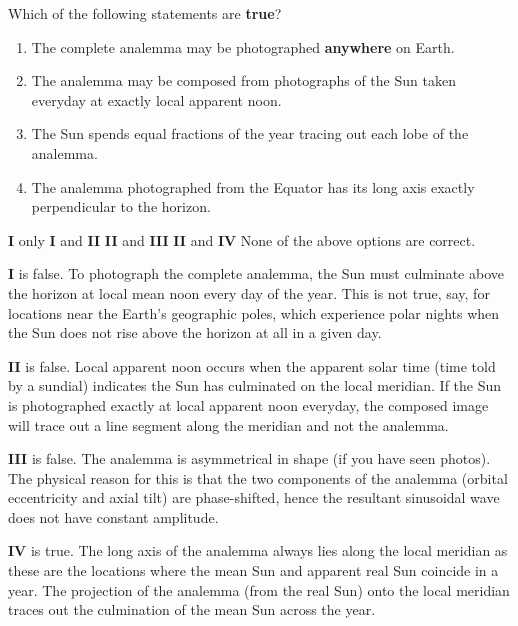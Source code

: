 \documentclass[a4paper,11pt]{exam}
\begin{document}
\begin{questions}
\filbreak
\question
	Which of the following statements are \textbf{true}?
	\begin{enumerate}[align=left,labelsep=0pt,leftmargin=0pt,labelsep=3pt,itemindent=23pt,parsep=6pt,label=\textbf{\Roman{*}}.]
		\item   The complete analemma may be photographed \textbf{anywhere} on Earth.
		\item	The analemma may be composed from photographs of the Sun taken everyday at exactly local \hspace*{20pt} apparent noon.
		\item	The Sun spends equal fractions of the year tracing out each lobe of the analemma.
		\item	The analemma photographed from the Equator has its long axis exactly perpendicular to the \hspace*{20pt} horizon.
	\end{enumerate}
	\begin{choices}
		\choice	\textbf{I} only
		\choice	\textbf{I} and \textbf{II}
		\choice	\textbf{II} and \textbf{III}
		\choice	\textbf{II} and \textbf{IV}
		\correctchoice	None of the above options are correct.
	\end{choices}
	\begin{solution}
		\textbf{I} is false. To photograph the complete analemma, the Sun must culminate above the horizon at local mean noon every day of the year. This is not true, say, for locations near the Earth’s geographic poles, which experience polar nights when the Sun does not rise above the horizon at all in a given day.

		\textbf{II} is false. Local apparent noon occurs when the apparent solar time (time told by a sundial) indicates the Sun has culminated on the local meridian. If the Sun is photographed exactly at local apparent noon everyday, the composed image will trace out a line segment along the meridian and not the analemma.

		\textbf{III} is false. The analemma is asymmetrical in shape (if you have seen photos). The physical reason for this is that the two components of the analemma (orbital eccentricity and axial tilt) are phase-shifted, hence the resultant sinusoidal wave does not have constant amplitude.

		\textbf{IV} is true. The long axis of the analemma always lies along the local meridian as these are the locations where the mean Sun and apparent real Sun coincide in a year. The projection of the analemma (from the real Sun) onto the local meridian traces out the culmination of the mean Sun across the year.
	\end{solution}


\end{questions}
\end{document}
